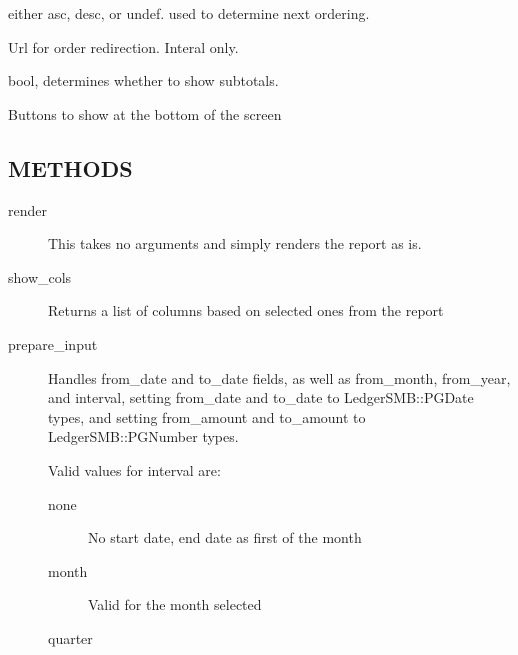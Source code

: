 \begin{description}
\begin{description}
\begin{description}
\begin{description}
\begin{description}
\begin{description}
\begin{description}
\begin{description}
\begin{description}
\begin{description}
\begin{description}
either asc, desc, or undef.  used to determine next ordering.


\item[{order\_url}] \mbox{}

Url for order redirection.  Interal only.


\item[{show\_subtotals}] \mbox{}

bool, determines whether to show subtotals.


\item[{buttons}] \mbox{}

Buttons to show at the bottom of the screen

\end{description}
\subsection*{METHODS\label{LedgerSMB::DBObject::Report_METHODS}}
\begin{description}

\item[{render}] \mbox{}

This takes no arguments and simply renders the report as is.


\item[{show\_cols}] \mbox{}

Returns a list of columns based on selected ones from the report


\item[{prepare\_input}] \mbox{}

Handles from\_date and to\_date fields, as well as from\_month, from\_year, and 
interval, setting from\_date and to\_date to LedgerSMB::PGDate types, and setting
from\_amount and to\_amount to LedgerSMB::PGNumber types.



Valid values for interval are:

\begin{description}

\item[{none}] \mbox{}

No start date, end date as first of the month


\item[{month}] \mbox{}

Valid for the month selected


\item[{quarter}] \mbox{}


\end{description}
\end{description}
\end{description}
\end{description}
\end{description}
\end{description}
\end{description}
\end{description}
\end{description}
\end{description}
\end{description}
\end{description}
